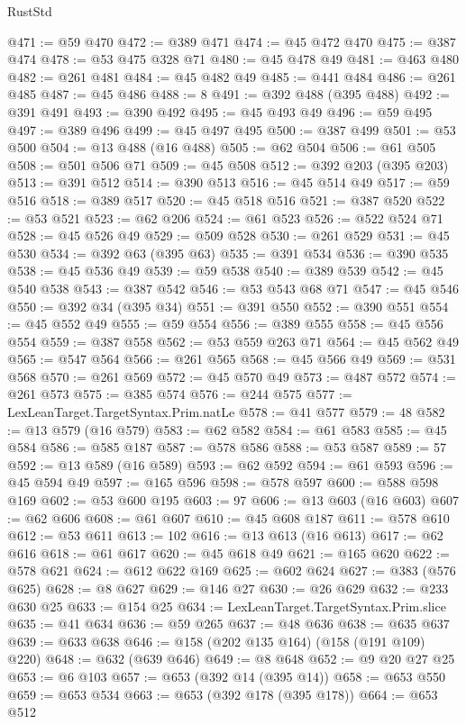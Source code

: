 \begin{lexlean}{RustStd}
\begin{coremodule}
{\begin{coremodule}
{{{{{{{{{{{{@471 := @59 @470
@472 := @389 @471
@474 := @45 @472 @470
@475 := @387 @474
@478 := @53 @475 @328 @71
@480 := @45 @478 @49
@481 := @463 @480
@482 := @261 @481
@484 := @45 @482 @49
@485 := @441 @484
@486 := @261 @485
@487 := @45 @486
@488 := 8
@491 := @392 @488 (@395 @488)
@492 := @391 @491
@493 := @390 @492
@495 := @45 @493 @49
@496 := @59 @495
@497 := @389 @496
@499 := @45 @497 @495
@500 := @387 @499
@501 := @53 @500
@504 := @13 @488 (@16 @488)
@505 := @62 @504
@506 := @61 @505
@508 := @501 @506 @71
@509 := @45 @508
@512 := @392 @203 (@395 @203)
@513 := @391 @512
@514 := @390 @513
@516 := @45 @514 @49
@517 := @59 @516
@518 := @389 @517
@520 := @45 @518 @516
@521 := @387 @520
@522 := @53 @521
@523 := @62 @206
@524 := @61 @523
@526 := @522 @524 @71
@528 := @45 @526 @49
@529 := @509 @528
@530 := @261 @529
@531 := @45 @530
@534 := @392 @63 (@395 @63)
@535 := @391 @534
@536 := @390 @535
@538 := @45 @536 @49
@539 := @59 @538
@540 := @389 @539
@542 := @45 @540 @538
@543 := @387 @542
@546 := @53 @543 @68 @71
@547 := @45 @546
@550 := @392 @34 (@395 @34)
@551 := @391 @550
@552 := @390 @551
@554 := @45 @552 @49
@555 := @59 @554
@556 := @389 @555
@558 := @45 @556 @554
@559 := @387 @558
@562 := @53 @559 @263 @71
@564 := @45 @562 @49
@565 := @547 @564
@566 := @261 @565
@568 := @45 @566 @49
@569 := @531 @568
@570 := @261 @569
@572 := @45 @570 @49
@573 := @487 @572
@574 := @261 @573
@575 := @385 @574
@576 := @244 @575
@577 := LexLeanTarget.TargetSyntax.Prim.natLe
@578 := @41 @577
@579 := 48
@582 := @13 @579 (@16 @579)
@583 := @62 @582
@584 := @61 @583
@585 := @45 @584
@586 := @585 @187
@587 := @578 @586
@588 := @53 @587
@589 := 57
@592 := @13 @589 (@16 @589)
@593 := @62 @592
@594 := @61 @593
@596 := @45 @594 @49
@597 := @165 @596
@598 := @578 @597
@600 := @588 @598 @169
@602 := @53 @600 @195
@603 := 97
@606 := @13 @603 (@16 @603)
@607 := @62 @606
@608 := @61 @607
@610 := @45 @608 @187
@611 := @578 @610
@612 := @53 @611
@613 := 102
@616 := @13 @613 (@16 @613)
@617 := @62 @616
@618 := @61 @617
@620 := @45 @618 @49
@621 := @165 @620
@622 := @578 @621
@624 := @612 @622 @169
@625 := @602 @624
@627 := @383 (@576 @625)
@628 := @8 @627
@629 := @146 @27
@630 := @26 @629
@632 := @233 @630 @25
@633 := @154 @25
@634 := LexLeanTarget.TargetSyntax.Prim.slice
@635 := @41 @634
@636 := @59 @265
@637 := @48 @636
@638 := @635 @637
@639 := @633 @638
@646 := @158 (@202 @135 @164) (@158 (@191 @109) @220)
@648 := @632 (@639 @646)
@649 := @8 @648
@652 := @9 @20 @27 @25
@653 := @6 @103
@657 := @653 (@392 @14 (@395 @14))
@658 := @653 @550
@659 := @653 @534
@663 := @653 (@392 @178 (@395 @178))
@664 := @653 @512
}}}}}}}}}}}}
\end{coremodule}}
\end{coremodule}
\end{lexlean}
